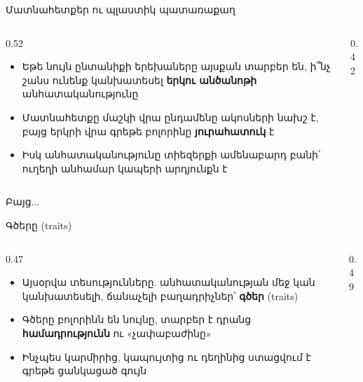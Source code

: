 \begin{frame}{Մատնահետքեր ու պլաստիկ պատառաքաղ}
  \begin{columns}[c]
    \begin{column}{0.52\textwidth}
      \begin{itemize}
        \item Եթե նույն ընտանիքի երեխաները այսքան տարբեր են, ի՞նչ շանս ունենք կանխատեսել \textbf{երկու անծանոթի} անհատականությունը
        \item<2-> Մատնահետքը մաշկի վրա ընդամենը ակոսների նախշ է, բայց երկրի վրա գրեթե բոլորինը \textbf{յուրահատուկ} է
        \item<3-> Իսկ անհատականությունը տիեզերքի ամենաբարդ բանի՝ ուղեղի անհամար կապերի արդյունքն է
      \end{itemize}
    \end{column}
    \begin{column}{0.42\textwidth}
      \centering
    \end{column}
  \end{columns}
\end{frame}

\begin{frame}{Բայց...}
  \centering
  
\end{frame}

\begin{frame}{Գծերը (traits)}
  \begin{columns}[c]
    \begin{column}{0.47\textwidth}
      \begin{itemize}
        \item Այսօրվա տեսությունները. անհատականության մեջ կան կանխատեսելի, ճանաչելի բաղադրիչներ՝ \textbf{գծեր} (traits)
        \item<2-> Գծերը բոլորինն են նույնը, տարբեր է դրանց \textbf{համադրությունն} ու «չափաբաժինը»
        \item<3-> Ինչպես կարմիրից, կապույտից ու դեղինից ստացվում է գրեթե ցանկացած գույն
      \end{itemize}
    \end{column}
    \begin{column}{0.49\textwidth}
    \end{column}
  \end{columns}
\end{frame}

